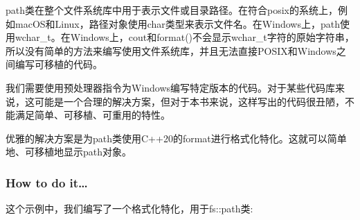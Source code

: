 
path类在整个文件系统库中用于表示文件或目录路径。在符合posix的系统上，例如macOS和Linux，路径对象使用char类型来表示文件名。在Windows上，path使用wchar\_t。在Windows上，cout和format()不会显示wchar\_t字符的原始字符串，所以没有简单的方法来编写使用文件系统库，并且无法直接POSIX和Windows之间编写可移植的代码。

我们需要使用预处理器指令为Windows编写特定版本的代码。对于某些代码库来说，这可能是一个合理的解决方案，但对于本书来说，这样写出的代码很丑陋，不能满足简单、可移植、可重用的特性。

优雅的解决方案是为path类使用C++20的format进行格式化特化。这就可以简单地、可移植地显示path对象。

\subsubsection{How to do it…}

这个示例中，我们编写了一个格式化特化，用于fs::path类:

